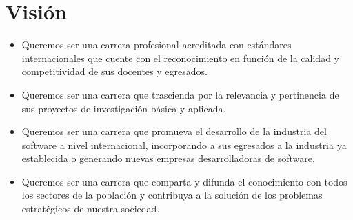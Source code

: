 \section{Visión}\label{sec:cs-vision}
\begin{itemize}
\item Queremos ser una carrera profesional acreditada con estándares internacionales que
cuente con el reconocimiento en función de la calidad y competitividad de sus docentes 
y egresados.

\item Queremos ser una carrera que trascienda por la relevancia y pertinencia
de sus proyectos de investigación básica y aplicada.

\item Queremos ser una carrera que promueva el desarrollo de la industria del
software a nivel internacional, incorporando a sus egresados a la industria 
ya establecida o generando nuevas empresas desarrolladoras de software.

\item Queremos ser una carrera que comparta y difunda el conocimiento con
todos los sectores de la población y contribuya a la solución de los problemas 
estratégicos de nuestra sociedad.
\end{itemize}
